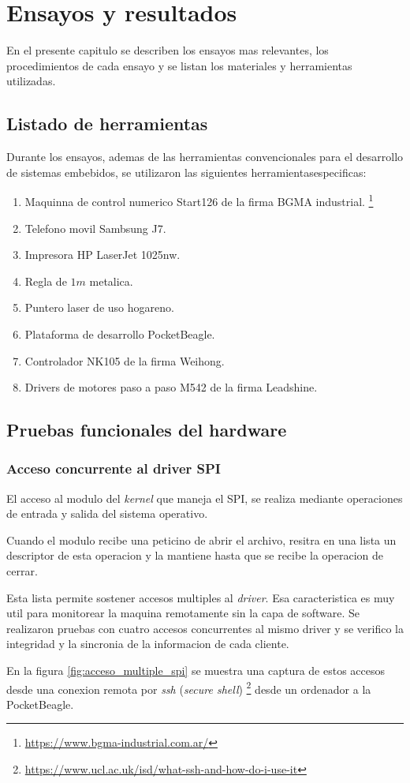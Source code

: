 \chapter{Ensayos y resultados} %
\label{Chapter4}

En el presente capitulo se describen los ensayos mas relevantes, los procedimientos de cada ensayo y se listan los materiales y herramientas utilizadas.

\section{Listado de herramientas}

Durante los ensayos, ademas de las herramientas convencionales para el desarrollo de sistemas embebidos, se utilizaron las siguientes herramientasespecificas:
\begin{enumerate}
   \item{Maquinna de control numerico Start126 de la firma BGMA industrial. \footnote{\url{https://www.bgma-industrial.com.ar/}}}
   \item{Telefono movil Sambsung J7.}
   \item{Impresora HP LaserJet 1025nw.}
   \item{Regla de $1m$ metalica.}
   \item{Puntero laser de uso hogareno.}
   \item{Plataforma de desarrollo PocketBeagle.}
   \item{Controlador NK105 de la firma Weihong.}
   \item{Drivers de motores paso a paso M542 de la firma Leadshine.}
\end{enumerate}

\section{Pruebas funcionales del hardware}
\label{sec:pruebasHW}

\subsection{Acceso concurrente al driver SPI}
El acceso al modulo del \textit{kernel} que maneja el SPI, se realiza mediante operaciones de entrada y salida del sistema operativo.\par
Cuando el modulo recibe una peticino de abrir el archivo, resitra en una lista un descriptor de esta operacion y la mantiene hasta que se recibe la operacion de cerrar. \par
Esta lista permite sostener accesos multiples al \textit{driver}. Esa caracteristica es muy util para monitorear la maquina remotamente sin la capa de software.
Se realizaron pruebas con cuatro accesos concurrentes al mismo driver y se verifico la integridad y la sincronia de la informacion de cada cliente.\par
En la figura \ref{fig:acceso_multiple_spi} se muestra una captura de estos accesos desde una conexion remota por \textit{ssh} (\textit{secure shell}) \footnote{\url{https://www.ucl.ac.uk/isd/what-ssh-and-how-do-i-use-it}} desde un ordenador a la PocketBeagle.

